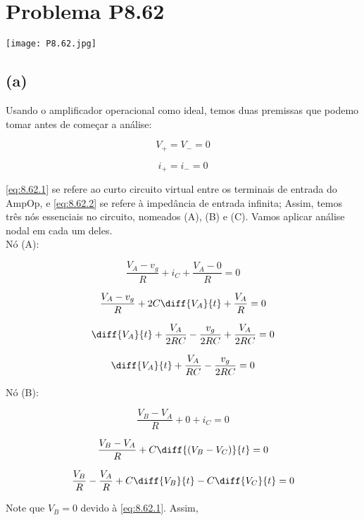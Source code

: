 
\section*{Problema P8.62}

\renewcommand*\thesection{8.62}

\begin{center}
    \texttt{[image: P8.62.jpg]}
\end{center}

\subsection*{(a)}

Usando o amplificador operacional como ideal, temos duas premissas que podemo tomar antes de começar a análise:

\begin{equation}\label{eq:8.62.1}
    V_+ = V_- = 0
\end{equation}

\begin{equation}\label{eq:8.62.2}
    i_+ = i_- = 0
\end{equation}

\eqref{eq:8.62.1} se refere ao curto circuito virtual entre os terminais de entrada do AmpOp, e \eqref{eq:8.62.2} se refere à impedância de entrada infinita;
Assim, temos três nós essenciais no circuito, nomeados (A), (B) e (C). Vamos aplicar análise nodal em cada um deles. \\
Nó (A): 

\[ \frac{V_A - v_g}{R} + i_C + \frac{V_A - 0}{R} = 0 \]

\[ \frac{V_A - v_g}{R} + 2C\diff{V_A}{t} + \frac{V_A}{R} = 0 \]

\[ \diff{V_A}{t} + \frac{V_A}{2RC} - \frac{v_g}{2RC} + \frac{V_A}{2RC} = 0 \]

\begin{equation}\label{eq:8.62.3}
    \diff{V_A}{t} + \frac{V_A}{RC} - \frac{v_g}{2RC} = 0
\end{equation}

Nó (B): 

\[ \frac{V_B - V_A}{R} + 0 + i_C = 0 \]

\[ \frac{V_B - V_A}{R} + C\diff{(V_B - V_C)}{t} = 0 \]

\[ \frac{V_B}{R} - \frac{V_A}{R} + C\diff{V_B}{t} - C\diff{V_C}{t} = 0 \]

Note que $V_B = 0$ devido à \eqref{eq:8.62.1}. Assim, 

